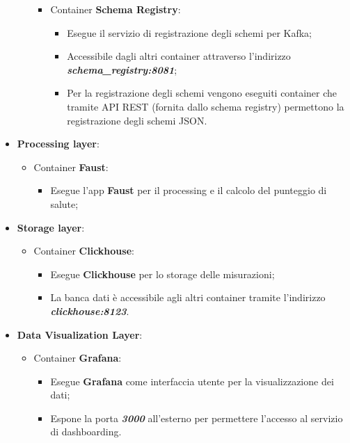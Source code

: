 \begin{itemize}
\begin{itemize}
\begin{itemize}
\begin{itemize}
        \end{itemize}
        \item Container \textbf{Schema Registry}:
        \begin{itemize}
            \item Esegue il servizio di registrazione degli schemi per Kafka;
            \item Accessibile dagli altri container attraverso l’indirizzo \textit{\textbf{schema\_registry:8081}};
            \item Per la registrazione degli schemi vengono eseguiti container che tramite API REST (fornita dallo schema registry) permettono la registrazione degli schemi JSON.
        \end{itemize}
       \end{itemize}
        
    \end{itemize} 
    \item \textbf{Processing layer}:
    \begin{itemize}
        \item Container \textbf{Faust}:
        \begin{itemize}
            \item Esegue l'app \textbf{Faust} per il processing e il calcolo del punteggio di salute;
        \end{itemize}
    \end{itemize}
    \item \textbf{Storage layer}:
    \begin{itemize}
        \item Container \textbf{Clickhouse}:
        \begin{itemize}
            \item Esegue \textbf{Clickhouse} per lo storage delle misurazioni;
            \item La banca dati è accessibile agli altri container tramite l'indirizzo \textit{\textbf{clickhouse:8123}}.
        \end{itemize}
    \end{itemize}
    \item \textbf{Data Visualization Layer}:
    \begin{itemize}
        \item Container \textbf{Grafana}:
        \begin{itemize}
            \item Esegue \textbf{Grafana} come interfaccia utente per la visualizzazione dei dati;
            \item Espone la porta \textbf{\textit{3000}} all'esterno per permettere l'accesso al servizio di dashboarding.
        \end{itemize}
    \end{itemize}
    
\end{itemize}
